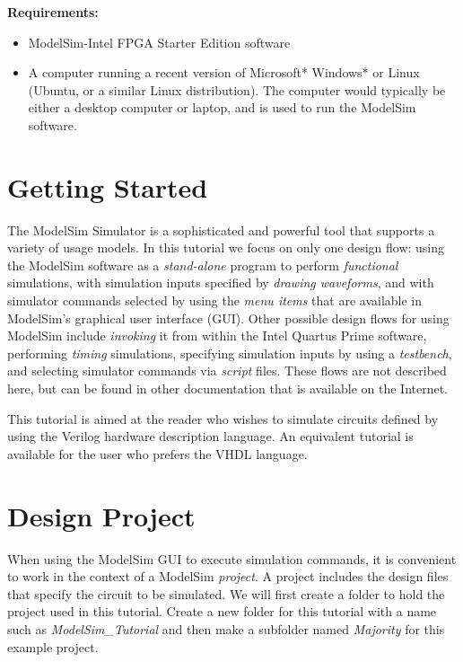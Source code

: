 \documentclass[11pt, twoside, pdftex]{article}
\begin{document}
{\bf Requirements:}
\begin{itemize}
\item ModelSim-Intel FPGA Starter Edition software
\item A computer running a recent version of Microsoft* Windows* or Linux 
(Ubuntu, or a similar Linux distribution). The computer would typically be either a
desktop computer or laptop, and is used to run the ModelSim software.
\end{itemize}

\clearpage
\newpage
\section{Getting Started}

The ModelSim Simulator is a sophisticated and powerful tool that supports a variety of 
usage models. In this tutorial we focus on only one design flow: using the ModelSim
software as a {\it stand-alone} program to perform {\it functional} simulations, with 
simulation inputs specified by {\it drawing waveforms}, and with simulator commands selected 
by using the {\it menu items} that are available in ModelSim's graphical user interface
(GUI).  Other possible design flows for using ModelSim include {\it invoking} it from within the 
Intel Quartus Prime software, performing {\it timing} simulations, specifying simulation 
inputs by using a {\it testbench}, and selecting simulator commands via {\it script} files.
These flows are not described here, but can be found in other
documentation that is available on the Internet.  

This tutorial is aimed at the reader who wishes to simulate circuits defined
by using the Verilog hardware description language. An equivalent tutorial is
available for the user who prefers the VHDL language.
 
\section{Design Project}
When using the ModelSim GUI to execute simulation commands, it is convenient to work in the
context of a ModelSim {\it project}. A project includes the design files that specify the 
circuit to be simulated. We will first create a folder to hold the project used 
in this tutorial.  Create a new folder for this tutorial with a name such as
{\it ModelSim\_Tutorial} and then make a subfolder named {\it Majority} for this 
example project.
\end{document}

